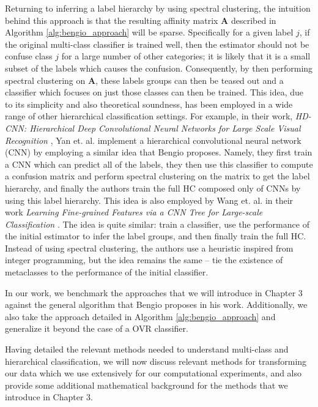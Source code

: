 \documentclass[../thesis.tex]{subfiles}
\begin{document}
Returning to inferring a label hierarchy by using spectral clustering, the intuition behind this approach is that the resulting affinity matrix $\mathbf{A}$ described in Algorithm \ref{alg:bengio_approach} will be sparse. Specifically for a given label $j$, if the original multi-class classifier is trained well, then the estimator should not be confuse class $j$ for a large number of other categories; it is likely that it is a small subset of the labels which causes the confusion. Consequently, by then performing spectral clustering on $\mathbf{A}$, these labels groups can then be teased out and a classifier which focuses on just those classes can then be trained. This idea, due to its simplicity and also theoretical soundness, has been employed in a wide range of other hierarchical classification settings. For example, in their work, \textit{HD-CNN: Hierarchical Deep Convolutional Neural Networks for Large Scale Visual Recognition} \cite{yan2015hd}, Yan et. al. implement a hierarchical convolutional neural network (CNN) by employing a similar idea that Bengio proposes. Namely, they first train a CNN which can predict all of the labels, they then use this classifier to compute a confusion matrix and perform spectral clustering on the matrix to get the label hierarchy, and finally the authors train the full HC composed only of CNNs by using this label hierarchy. This idea is also employed by Wang et. al. in their work \textit{Learning Fine-grained Features via a CNN Tree for Large-scale Classification} \cite{wang2018learning}. The idea is quite similar: train a classifier, use the performance of the initial estimator to infer the label groups, and then finally train the full HC. Instead of using spectral clustering, the authors use a heuristic inspired from integer programming, but the idea remains the same -- tie the existence of metaclasses to the performance of the initial classifier. 

In our work, we benchmark the approaches that we will introduce in Chapter 3 against the general algorithm that Bengio proposes in his work. Additionally, we also take the approach detailed in Algorithm \ref{alg:bengio_approach} and generalize it beyond the case of a OVR classifier.

Having detailed the relevant methods needed to understand multi-class and hierarchical classification, we will now discuss relevant methods for transforming our data which we use extensively for our computational experiments, and also provide some additional mathematical background for the methods that we introduce in Chapter 3.
\end{document}
